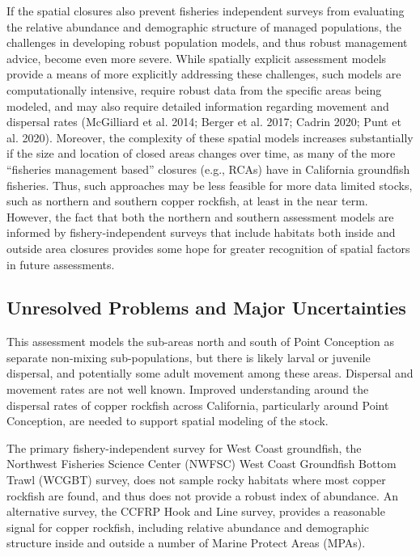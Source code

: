 \documentclass[11pt,
  english,
  letterpaper,
]{article}
\begin{document}
If the spatial closures also prevent fisheries independent surveys from evaluating the relative abundance and demographic structure of managed populations, the challenges in developing robust population models, and thus robust management advice, become even more severe. While spatially explicit assessment models provide a means of more explicitly addressing these challenges, such models are computationally intensive, require robust data from the specific areas being modeled, and may also require detailed information regarding movement and dispersal rates (McGilliard et al. 2014; Berger et al. 2017; Cadrin 2020; Punt et al. 2020). Moreover, the complexity of these spatial models increases substantially if the size and location of closed areas changes over time, as many of the more ``fisheries management based'' closures (e.g., RCAs) have in California groundfish fisheries. Thus, such approaches may be less feasible for more data limited stocks, such as northern and southern copper rockfish, at least in the near term. However, the fact that both the northern and southern assessment models are informed by fishery-independent surveys that include habitats both inside and outside area closures provides some hope for greater recognition of spatial factors in future assessments.

\hypertarget{unresolved-problems-and-major-uncertainties-1}{%
\subsection{Unresolved Problems and Major Uncertainties}\label{unresolved-problems-and-major-uncertainties-1}}

This assessment models the sub-areas north and south of Point Conception as separate non-mixing sub-populations, but there is likely larval or juvenile dispersal, and potentially some adult movement among these areas. Dispersal and movement rates are not well known. Improved understanding around the dispersal rates of copper rockfish across California, particularly around Point Conception, are needed to support spatial modeling of the stock.

The primary fishery-independent survey for West Coast groundfish, the Northwest Fisheries Science Center (NWFSC) West Coast Groundfish Bottom Trawl (WCGBT) survey, does not sample rocky habitats where most copper rockfish are found, and thus does not provide a robust index of abundance. An alternative survey, the CCFRP Hook and Line survey, provides a reasonable signal for copper rockfish, including relative abundance and demographic structure inside and outside a number of Marine Protect Areas (MPAs).
\end{document}
